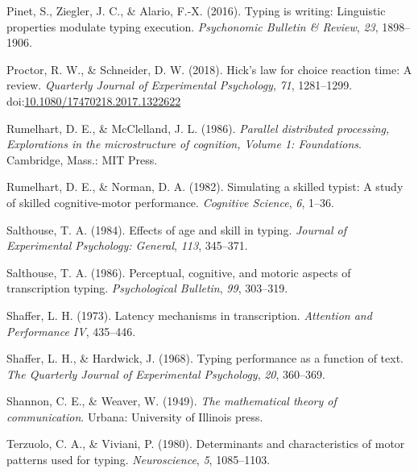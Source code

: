 \documentclass[,man,floatsintext]{apa6}
\begin{document}
\leavevmode\hypertarget{ref-PinetTypingwritingLinguistic2016}{}%
Pinet, S., Ziegler, J. C., \& Alario, F.-X. (2016). Typing is writing: Linguistic properties modulate typing execution. \emph{Psychonomic Bulletin \& Review}, \emph{23}, 1898--1906.

\leavevmode\hypertarget{ref-proctor_hicks_2018}{}%
Proctor, R. W., \& Schneider, D. W. (2018). Hick's law for choice reaction time: A review. \emph{Quarterly Journal of Experimental Psychology}, \emph{71}, 1281--1299. doi:\href{https://doi.org/10.1080/17470218.2017.1322622}{10.1080/17470218.2017.1322622}

\leavevmode\hypertarget{ref-rumelhart_parallel_1986}{}%
Rumelhart, D. E., \& McClelland, J. L. (1986). \emph{Parallel distributed processing, Explorations in the microstructure of cognition, Volume 1: Foundations}. Cambridge, Mass.: MIT Press.

\leavevmode\hypertarget{ref-RumelhartSimulatingskilledtypist1982}{}%
Rumelhart, D. E., \& Norman, D. A. (1982). Simulating a skilled typist: A study of skilled cognitive-motor performance. \emph{Cognitive Science}, \emph{6}, 1--36.

\leavevmode\hypertarget{ref-salthouse_effects_1984}{}%
Salthouse, T. A. (1984). Effects of age and skill in typing. \emph{Journal of Experimental Psychology: General}, \emph{113}, 345--371.

\leavevmode\hypertarget{ref-salthouse_perceptual_1986}{}%
Salthouse, T. A. (1986). Perceptual, cognitive, and motoric aspects of transcription typing. \emph{Psychological Bulletin}, \emph{99}, 303--319.

\leavevmode\hypertarget{ref-shaffer_latency_1973}{}%
Shaffer, L. H. (1973). Latency mechanisms in transcription. \emph{Attention and Performance IV}, 435--446.

\leavevmode\hypertarget{ref-shaffer_typing_1968}{}%
Shaffer, L. H., \& Hardwick, J. (1968). Typing performance as a function of text. \emph{The Quarterly Journal of Experimental Psychology}, \emph{20}, 360--369.

\leavevmode\hypertarget{ref-Shannonmathematicaltheorycommunication1949}{}%
Shannon, C. E., \& Weaver, W. (1949). \emph{The mathematical theory of communication}. Urbana: University of Illinois press.

\leavevmode\hypertarget{ref-terzuolo_determinants_1980}{}%
Terzuolo, C. A., \& Viviani, P. (1980). Determinants and characteristics of motor patterns used for typing. \emph{Neuroscience}, \emph{5}, 1085--1103.
\end{document}
